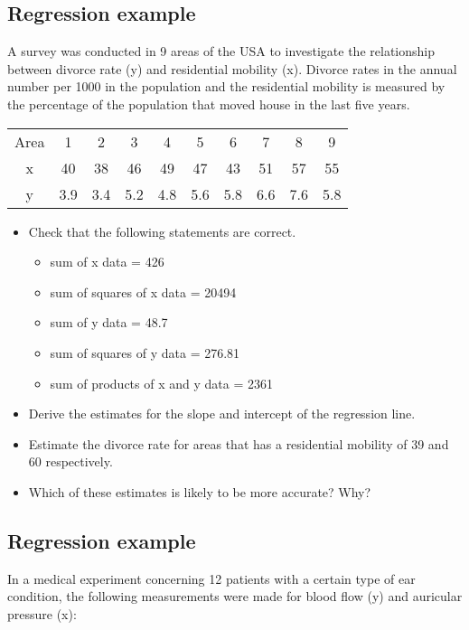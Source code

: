 
\subsection{Regression example}

A survey was conducted in 9 areas of the USA to investigate the relationship between
divorce rate (y) and residential mobility (x). Divorce rates in the annual number per 1000 in the population
and the residential mobility is measured by the percentage of the population that moved house in the last
five years.



\begin{tabular}{|c|c|c|c|c|c|c|c|c|c|}
  \hline
Area & 1 & 2 & 3 & 4 & 5 & 6 & 7 & 8 & 9  \\
x & 40 & 38 & 46 & 49 & 47 & 43 & 51 & 57 & 55\\
y & 3.9 & 3.4 & 5.2 & 4.8 & 5.6 & 5.8 & 6.6 & 7.6 & 5.8\\
  \hline
\end{tabular}

\begin{itemize}
\item Check that the following statements are correct.

\begin{itemize}
\item sum of x data = 426
\item sum of squares of x data = 20494
\item sum of y data = 48.7
\item sum of squares of y data = 276.81
\item sum of products of x and y data = 2361
\end{itemize}

\item Derive the estimates for the slope and intercept of the regression line.
\item Estimate the divorce rate for areas that has a residential mobility of 39 and 60 respectively.
\item Which of these estimates is likely to be more accurate? Why?

\end{itemize}
\newpage

\subsection{Regression example}

In a medical experiment concerning 12 patients with a certain type of ear condition,
the following measurements were made for blood flow (y) and auricular pressure (x):

